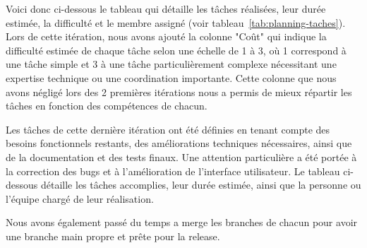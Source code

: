\documentclass[a4paper]{article}
\begin{document}
Voici donc ci-dessous le tableau qui détaille les tâches réalisées, leur durée estimée, la difficulté et le membre assigné (voir tableau~\ref{tab:planning-taches}). Lors de cette itération, nous avons ajouté la colonne "Coût" qui indique la difficulté estimée de chaque tâche selon une échelle de 1 à 3, où 1 correspond à une tâche simple et 3 à une tâche particulièrement complexe nécessitant une expertise technique ou une coordination importante. Cette colonne que nous avons négligé lors des 2 premières itérations nous a permis de mieux répartir les tâches en fonction des compétences de chacun.

Les tâches de cette dernière itération ont été définies en tenant compte des besoins fonctionnels restants, des améliorations techniques nécessaires, ainsi que de la documentation et des tests finaux. Une attention particulière a été portée à la correction des bugs et à l'amélioration de l'interface utilisateur. Le tableau ci-dessous détaille les tâches accomplies, leur durée estimée, ainsi que la personne ou l'équipe chargé de leur réalisation.

Nous avons également passé du temps a merge les branches de chacun pour avoir une branche main propre et prête pour la release.
\end{document}
